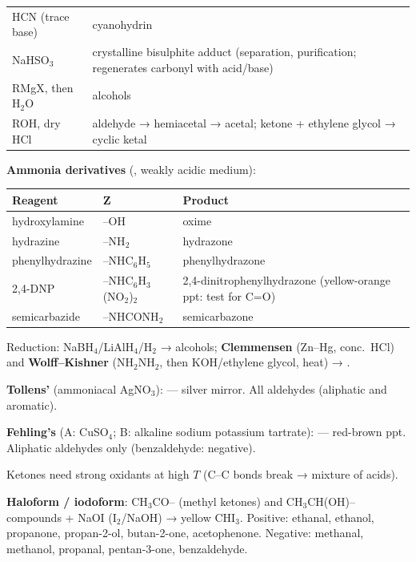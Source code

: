 \documentclass[9pt,a4paper]{extarticle}
\newcommand{\nr}[1]{\textbf{\color{uc!85!black}#1}}
\begin{document}
\begin{multicols}{2}
{\begin{tabularx}{\linewidth}{@{}l Y@{}}
\toprule
HCN (trace base) & cyanohydrin \\
NaHSO$_3$ & crystalline bisulphite adduct (separation, purification; regenerates carbonyl with acid/base)\\
RMgX, then H$_2$O & alcohols\\
ROH, dry HCl & aldehyde → hemiacetal → acetal; ketone + ethylene glycol → cyclic ketal\\
\bottomrule
\end{tabularx}\par}
\vspace{1pt}
\textbf{Ammonia derivatives} (, weakly acidic medium):\\
{\scriptsize\setlength{\tabcolsep}{2pt}
\begin{tabularx}{\linewidth}{@{}l l Y@{}}
\toprule
\textbf{Reagent} & \textbf{Z} & \textbf{Product}\\
\midrule
hydroxylamine & --OH & oxime\\
hydrazine & --NH$_2$ & hydrazone\\
phenylhydrazine & --NHC$_6$H$_5$ & phenylhydrazone\\
2,4-DNP & --NHC$_6$H$_3$(NO$_2$)$_2$ & 2,4-dinitrophenylhydrazone (yellow-orange ppt: test for C=O)\\
semicarbazide & --NHCONH$_2$ & semicarbazone\\
\bottomrule
\end{tabularx}\par}
\begin{fl}
\item Reduction: NaBH$_4$/LiAlH$_4$/H$_2$ → alcohols; \nr{Clemmensen} (Zn--Hg, conc.\ HCl) and \nr{Wolff--Kishner} (NH$_2$NH$_2$, then KOH/ethylene glycol, heat) → .
\item \textbf{Tollens'} (ammoniacal AgNO$_3$):  — silver mirror. All aldehydes (aliphatic and aromatic).
\item \textbf{Fehling's} (A: CuSO$_4$; B: alkaline sodium potassium tartrate):  — red-brown ppt. Aliphatic aldehydes only (benzaldehyde: negative).
\item Ketones need strong oxidants at high $T$ (C--C bonds break → mixture of acids).
\item \textbf{Haloform / iodoform}: CH$_3$CO-- (methyl ketones) and CH$_3$CH(OH)-- compounds + NaOI (I$_2$/NaOH) → yellow CHI$_3$. Positive: ethanal, ethanol, propanone, propan-2-ol, butan-2-one, acetophenone. Negative: methanal, methanol, propanal, pentan-3-one, benzaldehyde.

\end{fl}
\end{multicols}
\end{document}
